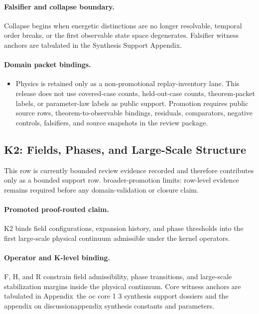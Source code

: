 \paragraph{Falsifier and collapse boundary.}
Collapse begins when energetic distinctions are no longer resolvable, temporal order breaks, or the first observable state space degenerates.
Falsifier witness anchors are tabulated in the Synthesis Support Appendix.

\paragraph{Domain packet bindings.}
\begin{itemize}[leftmargin=1.6em,nosep]
\item Physics is retained only as a non-promotional replay-inventory lane. This release does not use covered-case counts, held-out-case counts, theorem-packet labels, or parameter-law labels as public support. Promotion requires public source rows, theorem-to-observable bindings, residuals, comparators, negative controls, falsifiers, and source snapshots in the review package.
\end{itemize}

\subsection{K2: Fields, Phases, and Large-Scale Structure}
\label{sec:oc-core-1-3-synthesis-k2}
This row is currently bounded review evidence recorded and therefore contributes only as a bounded support row.
broader-promotion limits: row-level evidence remains required before any domain-validation or closure claim.

\paragraph{Promoted proof-routed claim.}
K2 binds field configurations, expansion history, and phase thresholds into the first large-scale physical continuum admissible under the kernel operators.

\paragraph{Operator and K-level binding.}
F, H, and R constrain field admissibility, phase transitions, and large-scale stabilization margins inside the physical continuum.
Core witness anchors are tabulated in Appendix~the oc core 1 3 synthesis support dossiers and the appendix on discussionappendix synthesis constants and parameters.

